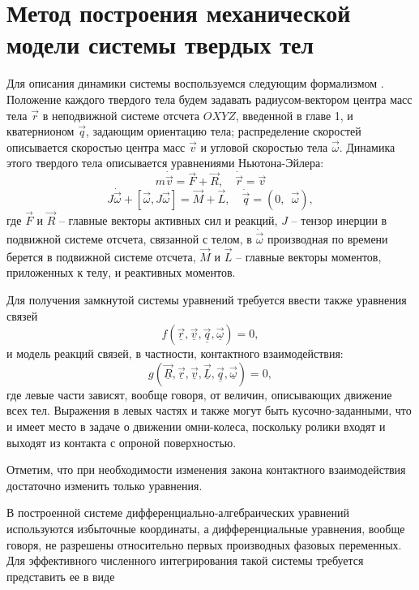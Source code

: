 \section{Метод построения механической модели системы твердых тел}

Для описания динамики системы воспользуемся следующим формализмом \cite{Kosenko2006,Kosenko2007,KosenkoQuaternionRus}. Положение каждого твердого тела будем задавать радиусом-вектором центра масс тела $\vec{r}$ в неподвижной системе отсчета $OXYZ$, введенной в главе 1, и кватернионом $\vec{q}$, задающим ориентацию тела; распределение скоростей описывается скоростью центра масс $\vec{v}$ и угловой скоростью тела $\vec{\omega}$.
Динамика этого твердого тела описывается уравнениями Ньютона-Эйлера:
$$ m\dot{\vec{v}} = \vec{F} + \vec{R}, \quad \dot{\vec{r}} = \vec{v} $$
$$ J\dot{\vec{\omega}} + [ \vec{\omega}, J\vec{\omega} ] = \vec{M} + \vec{L}, \quad \dot{\vec{q}} = (0, \enspace \vec{\omega}), $$
где $\vec{F}$ и $\vec{R}$ -- главные векторы активных сил и реакций, $J$ -- тензор инерции в подвижной системе отсчета, связанной с телом, в $\dot{\vec{\omega}}$ производная по времени берется в подвижной системе отсчета, $\vec{M}$ и $\vec{L}$ -- главные векторы моментов, приложенных к телу, и реактивных моментов.

Для получения замкнутой системы уравнений требуется ввести также уравнения связей 
\begin{equation}\label{eq:mo_cstr}
    f(\vec{\underline{r}}, \vec{\underline{v}}, \vec{\underline{q}}, \vec{\underline{\omega}}) = 0,
\end{equation}
и модель реакций связей, в частности, контактного взаимодействия:
\begin{equation}\label{eq:mo_reac}
    g(\vec{\underline{R}}, \vec{\underline{r}}, \vec{\underline{v}}, \vec{\underline{L}}, \vec{\underline{q}}, \vec{\underline{\omega}}) = 0,
\end{equation}
где левые части зависят, вообще говоря, от величин, описывающих движение всех тел. Выражения в левых частях и также могут быть кусочно-заданными, что и имеет место в задаче о движении омни-колеса, поскольку ролики входят и выходят из контакта с опроной поверхностью.

Отметим, что при необходимости изменения закона контактного взаимодействия достаточно изменить только уравнения.

В построенной системе дифференциально-алгебраических уравнений используются избыточные координаты, а дифференциальные уравнения, вообще говоря, не разрешены относительно первых производных фазовых переменных. Для эффективного численного интегрирования такой системы требуется представить ее в виде

